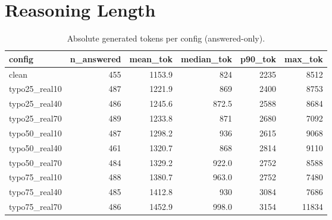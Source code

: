 \documentclass[11pt]{article}
\begin{document}
\section*{Reasoning Length}
\begin{table}[H]
\centering
\caption{Absolute generated tokens per config (answered-only).}
\small
\begin{adjustbox}{max width=\textwidth}
\begin{tabular}{lrrrrr}
\toprule
\textbf{config} & \textbf{n\_answered} & \textbf{mean\_tok} & \textbf{median\_tok} & \textbf{p90\_tok} & \textbf{max\_tok} \\
\midrule
clean & 455 & 1153.9 & 824 & 2235 & 8512 \\
typo25\_real10 & 487 & 1221.9 & 869 & 2400 & 8753 \\
typo25\_real40 & 486 & 1245.6 & 872.5 & 2588 & 8684 \\
typo25\_real70 & 489 & 1233.8 & 871 & 2680 & 7092 \\
typo50\_real10 & 487 & 1298.2 & 936 & 2615 & 9068 \\
typo50\_real40 & 461 & 1320.7 & 868 & 2814 & 9110 \\
typo50\_real70 & 484 & 1329.2 & 922.0 & 2752 & 8588 \\
typo75\_real10 & 488 & 1380.7 & 963.0 & 2752 & 7480 \\
typo75\_real40 & 485 & 1412.8 & 930 & 3084 & 7686 \\
typo75\_real70 & 486 & 1452.9 & 998.0 & 3154 & 11834 \\
\bottomrule
\end{tabular}
\end{adjustbox}
\end{table}
\end{document}
